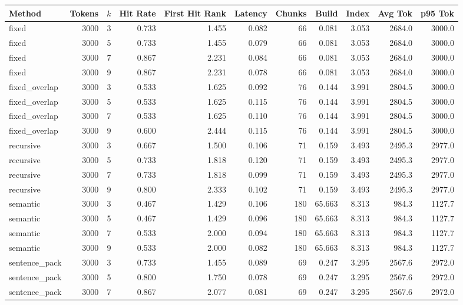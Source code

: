 \documentclass[pdflatex,sn-mathphys-num]{sn-jnl}
\theoremstyle{thmstyleone}
\theoremstyle{thmstyletwo}
\theoremstyle{thmstylethree}
\begin{document}
\begin{appendices}
\begin{table}
\begin{tabular}{@{}lrrrrrrrrrr@{}}
\toprule
Method & Tokens & $k$ & Hit Rate & First Hit Rank & Latency & Chunks & Build & Index & Avg Tok & p95 Tok \\
\midrule
fixed & 3000 & 3 & 0.733 & 1.455 & 0.082 & 66 & 0.081 & 3.053 & 2684.0 & 3000.0 \\
fixed & 3000 & 5 & 0.733 & 1.455 & 0.079 & 66 & 0.081 & 3.053 & 2684.0 & 3000.0 \\
fixed & 3000 & 7 & 0.867 & 2.231 & 0.084 & 66 & 0.081 & 3.053 & 2684.0 & 3000.0 \\
fixed & 3000 & 9 & 0.867 & 2.231 & 0.078 & 66 & 0.081 & 3.053 & 2684.0 & 3000.0 \\
fixed\_overlap & 3000 & 3 & 0.533 & 1.625 & 0.092 & 76 & 0.144 & 3.991 & 2804.5 & 3000.0 \\
fixed\_overlap & 3000 & 5 & 0.533 & 1.625 & 0.115 & 76 & 0.144 & 3.991 & 2804.5 & 3000.0 \\
fixed\_overlap & 3000 & 7 & 0.533 & 1.625 & 0.110 & 76 & 0.144 & 3.991 & 2804.5 & 3000.0 \\
fixed\_overlap & 3000 & 9 & 0.600 & 2.444 & 0.115 & 76 & 0.144 & 3.991 & 2804.5 & 3000.0 \\
recursive & 3000 & 3 & 0.667 & 1.500 & 0.106 & 71 & 0.159 & 3.493 & 2495.3 & 2977.0 \\
recursive & 3000 & 5 & 0.733 & 1.818 & 0.120 & 71 & 0.159 & 3.493 & 2495.3 & 2977.0 \\
recursive & 3000 & 7 & 0.733 & 1.818 & 0.099 & 71 & 0.159 & 3.493 & 2495.3 & 2977.0 \\
recursive & 3000 & 9 & 0.800 & 2.333 & 0.102 & 71 & 0.159 & 3.493 & 2495.3 & 2977.0 \\
semantic & 3000 & 3 & 0.467 & 1.429 & 0.106 & 180 & 65.663 & 8.313 & 984.3 & 1127.7 \\
semantic & 3000 & 5 & 0.467 & 1.429 & 0.096 & 180 & 65.663 & 8.313 & 984.3 & 1127.7 \\
semantic & 3000 & 7 & 0.533 & 2.000 & 0.094 & 180 & 65.663 & 8.313 & 984.3 & 1127.7 \\
semantic & 3000 & 9 & 0.533 & 2.000 & 0.082 & 180 & 65.663 & 8.313 & 984.3 & 1127.7 \\
sentence\_pack & 3000 & 3 & 0.733 & 1.455 & 0.089 & 69 & 0.247 & 3.295 & 2567.6 & 2972.0 \\
sentence\_pack & 3000 & 5 & 0.800 & 1.750 & 0.078 & 69 & 0.247 & 3.295 & 2567.6 & 2972.0 \\
sentence\_pack & 3000 & 7 & 0.867 & 2.077 & 0.081 & 69 & 0.247 & 3.295 & 2567.6 & 2972.0 \\

\end{tabular}
\end{table}
\end{appendices}
\end{document}
